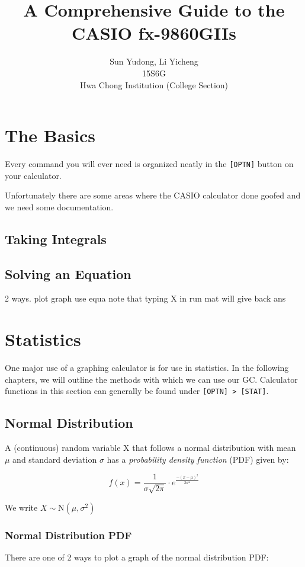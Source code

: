 \documentclass[a5paper]{memoir}
\title{A Comprehensive Guide to the CASIO fx-9860GIIs}
\author{Sun Yudong, Li Yicheng \\ 15S6G \\ Hwa Chong Institution (College Section)}
\def\code#1{\texttt{#1}}
\newcommand{\addtoindex}[1]{#1\index{#1}}
\begin{document}
\begin{titlingpage}%
	\maketitle
\end{titlingpage}

\chapter{The Basics}
Every command you will ever need is organized neatly in the \code{[OPTN]} button on your calculator.

Unfortunately there are some areas where the CASIO calculator done goofed and we need some documentation.

\section{Taking Integrals}

\section{Solving an Equation}
2 ways.
plot graph
use equa
note that typing X in run mat will give back ans

\chapter{Statistics}
One major use of a graphing calculator is for use in statistics. In the following chapters, we will outline the methods with which we can use our GC. Calculator functions in this section can generally be found under \code{[OPTN] > [STAT]}.

\section{Normal Distribution}
A (continuous) random variable X that follows a normal distribution with mean $\mu$ and standard deviation $\sigma$ has a \textit{probability density function} (PDF) given by:

\begin{equation}
	f(x)=\frac{1}{\sigma\sqrt{2\pi}} \cdot e^{\frac{-(x-\mu)^2}{2\sigma^2}}
\end{equation}

We write $X \sim \mathrm{N} (\mu,\sigma^2)$

\subsection{Normal Distribution PDF}
There are one of 2 ways to plot a graph of the normal distribution PDF:
\end{document}

